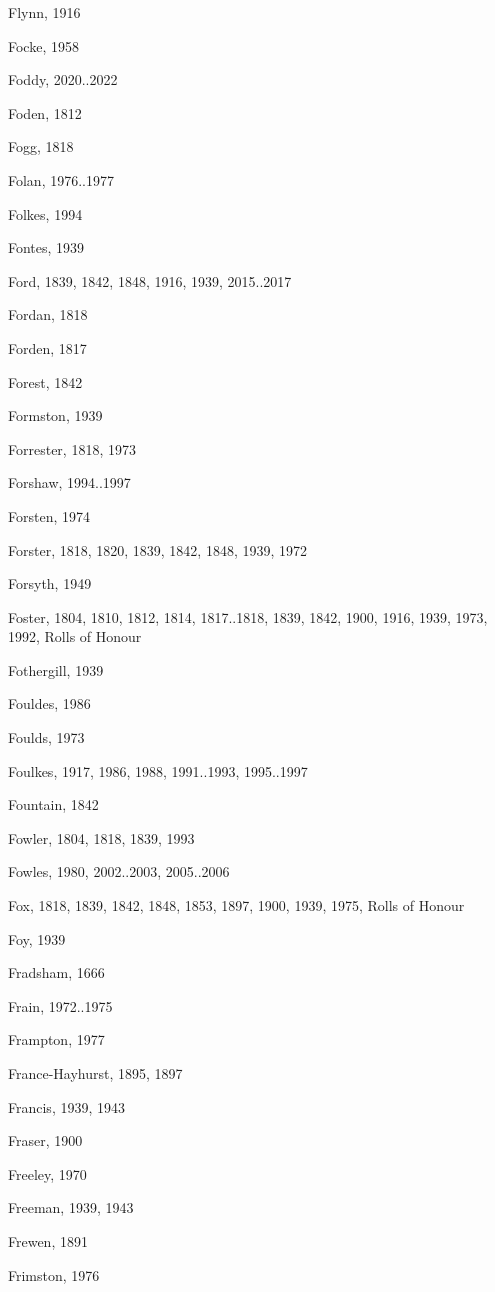 {\begin{theindex}
\item Flynn, 1916
\item Focke, 1958
\item Foddy, 2020..2022
\item Foden, 1812
\item Fogg, 1818
\item Folan, 1976..1977
\item Folkes, 1994
\item Fontes, 1939
\item Ford, 1839, 1842, 1848, 1916, 1939, 2015..2017
\item Fordan, 1818
\item Forden, 1817
\item Forest, 1842
\item Formston, 1939
\item Forrester, 1818, 1973
\item Forshaw, 1994..1997
\item Forsten, 1974
\item Forster, 1818, 1820, 1839, 1842, 1848, 1939, 1972
\item Forsyth, 1949
\item Foster, 1804, 1810, 1812, 1814, 1817..1818, 1839, 1842, 1900, 1916, 1939, 1973, 1992, Rolls of Honour
\item Fothergill, 1939
\item Fouldes, 1986
\item Foulds, 1973
\item Foulkes, 1917, 1986, 1988, 1991..1993, 1995..1997
\item Fountain, 1842
\item Fowler, 1804, 1818, 1839, 1993
\item Fowles, 1980, 2002..2003, 2005..2006
\item Fox, 1818, 1839, 1842, 1848, 1853, 1897, 1900, 1939, 1975, Rolls of Honour
\item Foy, 1939
\item Fradsham, 1666
\item Frain, 1972..1975
\item Frampton, 1977
\item France-Hayhurst, 1895, 1897
\item Francis, 1939, 1943
\item Fraser, 1900
\item Freeley, 1970
\item Freeman, 1939, 1943
\item Frewen, 1891
\item Frimston, 1976

\end{theindex}}
